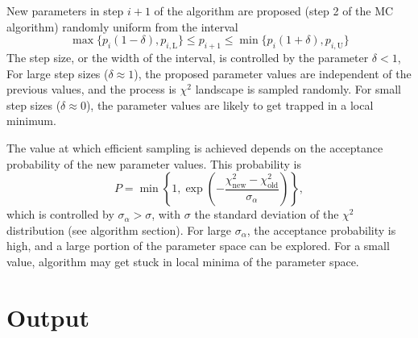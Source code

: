 \documentclass[  superscriptaddress]{revtex4}
\begin{document}
New parameters in step $i+1$ of the algorithm are proposed (step 2 of the MC algorithm) randomly uniform from the interval
\begin{equation}
  \max\{p_{i}(1-\delta), p_{i,\mathrm{L}} \} \leq p_{i+1} \leq \min\{p_{i}(1+\delta), p_{i,\mathrm{U}} \}
\end{equation}
The step size, or the width of the interval, is controlled by the parameter $\delta<1$,
For large step sizes ($\delta \approx 1$), the proposed parameter values are independent of the previous values, and the process is $\chi^2$ landscape is sampled randomly.
For small step sizes ($\delta \approx 0$), the parameter values are likely to get trapped in a local minimum.

The value at which efficient sampling is achieved depends on the acceptance probability of the new parameter values.
This probability is
\begin{equation}
  P = \min\left\{1, \exp\left(-\frac{\chi^2_\mathrm{new} - \chi^2_\mathrm{old}}{\sigma_\alpha}\right)\right\},
\end{equation}
which is controlled by $\sigma_\alpha>\sigma$, with $\sigma$ the standard deviation of the $\chi^2$ distribution (see algorithm section).
For large $\sigma_\alpha$, the acceptance probability is high, and a large portion of the parameter space can be explored. For a small value, algorithm may get stuck in local minima of the parameter space.


\section{Output} \label{sec:output}
\end{document}
